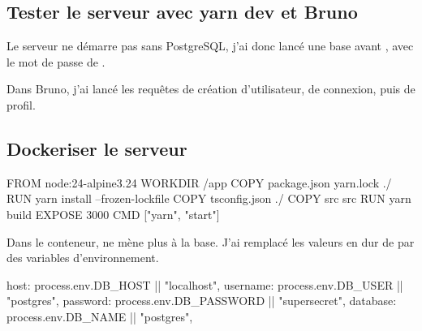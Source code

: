 

\subsection{Tester le serveur avec yarn dev et Bruno}

Le serveur ne démarre pas sans PostgreSQL, j'ai donc lancé une base avant , avec le mot de passe de .

\begin{commandes}
\end{commandes}


Dans Bruno, j'ai lancé les requêtes de création d'utilisateur, de connexion, puis de profil.


\subsection{Dockeriser le serveur}

\begin{fichier}[docker]
FROM node:24-alpine3.24
WORKDIR /app
COPY package.json yarn.lock ./
RUN yarn install --frozen-lockfile
COPY tsconfig.json ./
COPY src src
RUN yarn build
EXPOSE 3000
CMD ["yarn", "start"]
\end{fichier}

Dans le conteneur,  ne mène plus à la base. J'ai remplacé les valeurs en dur de  par des variables d'environnement.

\begin{fichier}[typescript]
host: process.env.DB_HOST || "localhost",
username: process.env.DB_USER || "postgres",
password: process.env.DB_PASSWORD || "supersecret",
database: process.env.DB_NAME || "postgres",
\end{fichier}


